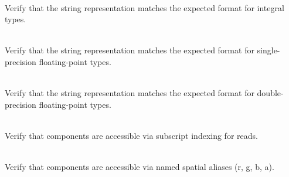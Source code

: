 \begin{DoxyRefList}
\item[{\parbox[t]{\linewidth}{Member \doxylink{_string_representation_tests_8cpp_a62cdd9b03764386bc89b3d41da7ded1b}{TEST\+\_\+F} (\doxylink{class_vector4_d_string_representation_tests}{Vector4\+DString\+Representation\+Tests}, Integral\+Representation)}}]\hfill \\
\label{test__test000146}%
%
Verify that the  string representation matches the expected format for integral types.  
\item[{\parbox[t]{\linewidth}{Member \doxylink{_string_representation_tests_8cpp_ae10a20c2f6cf9cf48db8c73e2790fcfc}{TEST\+\_\+F} (\doxylink{class_vector4_d_string_representation_tests}{Vector4\+DString\+Representation\+Tests}, Float\+Representation)}}]\hfill \\
\label{test__test000147}%
%
Verify that the  string representation matches the expected format for single-\/precision floating-\/point types.  
\item[{\parbox[t]{\linewidth}{Member \doxylink{_string_representation_tests_8cpp_a2666c87ac35f0f0bbfd0ac8fb21aa15d}{TEST\+\_\+F} (\doxylink{class_vector4_d_string_representation_tests}{Vector4\+DString\+Representation\+Tests}, Double\+Representation)}}]\hfill \\
\label{test__test000148}%
%
Verify that the  string representation matches the expected format for double-\/precision floating-\/point types.  
\item[{\parbox[t]{\linewidth}{Member \doxylink{group___f_g_m___vec4___access_gaa9c24a144611ff169cb8aeffabc13879}{Vector4\+DAccess\+\_\+\+Accessible\+As\+Array} ()}}]\hfill \\
\label{test__test000005}%
%
Verify that  components are accessible via subscript indexing for reads.  
\item[{\parbox[t]{\linewidth}{Member \doxylink{group___f_g_m___vec4___access_gabc2635e97434674a71f0a470cde0178d}{Vector4\+DAccess\+\_\+\+Accessible\+As\+RGBA} ()}}]\hfill \\
\label{test__test000004}%
%
Verify that  components are accessible via named spatial aliases (r, g, b, a).  
\item[{\parbox[t]{\linewidth}{Member \doxylink{group___f_g_m___vec4___access_ga1d4776b90945835ac95120f723607f9d}{Vector4\+DAccess\+\_\+\+Accessible\+As\+STPQ} ()}}]\hfill \\

\end{DoxyRefList}
